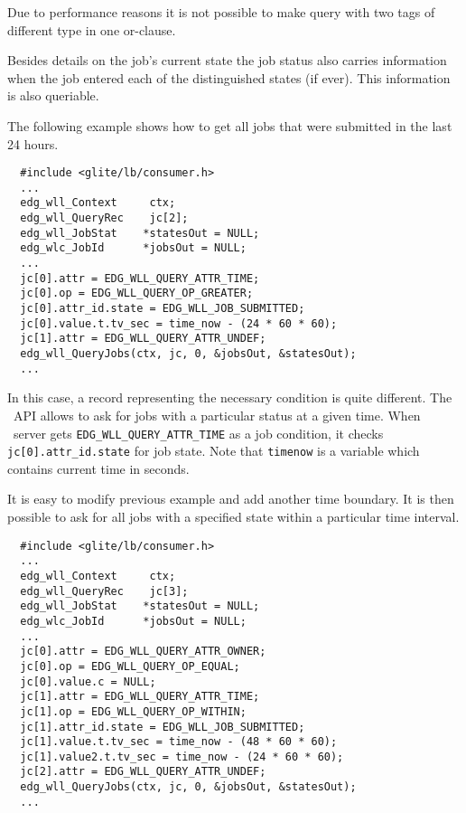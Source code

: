 Due to performance reasons 
it is not possible to make query with two tags of different type in one
or-clause. 


Besides details on the job's current state the job status also carries
information when the job entered each of the distinguished states
(if ever).
This information is also queriable.


The following example shows how to get all jobs that were submitted in
the last 24 hours.
\begin{verbatim}
  #include <glite/lb/consumer.h>
  ...
  edg_wll_Context     ctx;    
  edg_wll_QueryRec    jc[2];
  edg_wll_JobStat    *statesOut = NULL;
  edg_wlc_JobId      *jobsOut = NULL;
  ...
  jc[0].attr = EDG_WLL_QUERY_ATTR_TIME;
  jc[0].op = EDG_WLL_QUERY_OP_GREATER;
  jc[0].attr_id.state = EDG_WLL_JOB_SUBMITTED;
  jc[0].value.t.tv_sec = time_now - (24 * 60 * 60);
  jc[1].attr = EDG_WLL_QUERY_ATTR_UNDEF;
  edg_wll_QueryJobs(ctx, jc, 0, &jobsOut, &statesOut);
  ...
\end{verbatim}

In this case, a record representing the necessary condition is quite
different. The \LB\ API allows to ask for jobs with a particular status at a
given time. When \LB\ server gets \texttt{EDG\_WLL\_QUERY\_ATTR\_TIME}
as a job condition, it checks \texttt{jc[0].attr\_id.state} for job state. 
Note that \texttt{timenow} is a variable which contains current time in
seconds.

It is easy to modify previous example and add another time boundary. It is then 
possible to ask for all jobs with a specified state within a particular time
interval.
\begin{verbatim}
  #include <glite/lb/consumer.h>
  ...
  edg_wll_Context     ctx;    
  edg_wll_QueryRec    jc[3];
  edg_wll_JobStat    *statesOut = NULL;
  edg_wlc_JobId      *jobsOut = NULL;
  ...
  jc[0].attr = EDG_WLL_QUERY_ATTR_OWNER;
  jc[0].op = EDG_WLL_QUERY_OP_EQUAL;
  jc[0].value.c = NULL;
  jc[1].attr = EDG_WLL_QUERY_ATTR_TIME;
  jc[1].op = EDG_WLL_QUERY_OP_WITHIN;
  jc[1].attr_id.state = EDG_WLL_JOB_SUBMITTED;
  jc[1].value.t.tv_sec = time_now - (48 * 60 * 60);
  jc[1].value2.t.tv_sec = time_now - (24 * 60 * 60);
  jc[2].attr = EDG_WLL_QUERY_ATTR_UNDEF;
  edg_wll_QueryJobs(ctx, jc, 0, &jobsOut, &statesOut);
  ...
\end{verbatim}

